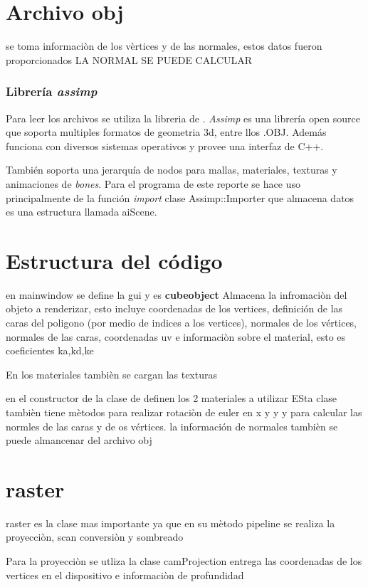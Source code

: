 \documentclass[12pt]{article}
\begin{document}
\section{Archivo obj}

se toma informaciòn de los vèrtices y de las normales, estos datos fueron proporcionados
LA NORMAL SE PUEDE CALCULAR
\subsubsection{Librería \textit{assimp}}

Para leer los archivos se utiliza la libreria de . 
\textit{Assimp} es una librería open source que soporta multiples formatos de geometria 3d, entre llos .OBJ. Además funciona con diversos sistemas operativos y provee una interfaz de C++.

También soporta una jerarquía de nodos para mallas, materiales, texturas y animaciones de \textit{bones}. Para el programa de este reporte se hace uso principalmente de la función \textit{import} clase Assimp::Importer que almacena datos es una estructura llamada aiScene.



\section{Estructura del código}


en mainwindow se define la gui y es 
\textbf{cubeobject}
Almacena la infromaciòn del objeto a renderizar, esto incluye coordenadas de los vertices, definición de las caras del poligono (por medio de indices a los vertices), normales de los vértices, normales de las caras, coordenadas uv e informaciòn sobre el material, esto es coeficientes ka,kd,ke

En los materiales tambièn se cargan las texturas 

en el constructor de la clase de definen los 2 materiales a utilizar
ESta clase tambièn tiene mètodos para realizar rotaciòn de euler en x y y  y para calcular las normles de las caras y de os vértices. la información de normales tambièn se puede almancenar del archivo obj

\section{raster}
raster es la clase mas importante ya que en su mètodo pipeline se realiza la proyecciòn, scan conversiòn y sombreado

Para la proyecciòn se utliza la clase camProjection
entrega las coordenadas de los vertices en el dispositivo e informaciòn de profundidad
\end{document}

